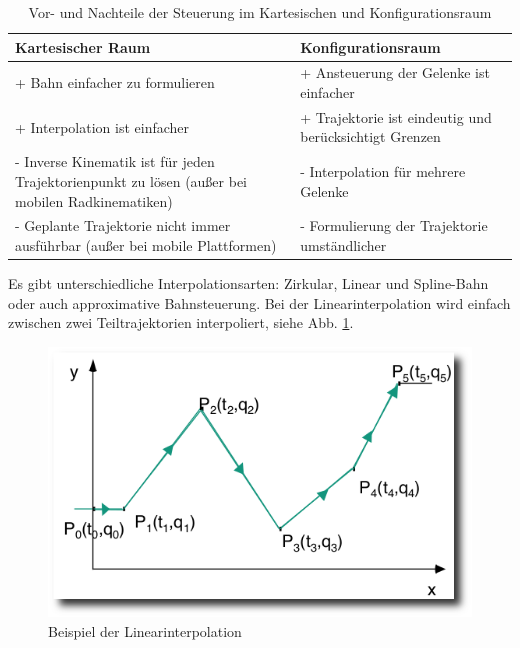 \begin{table}[h]
		\centering
		\begin{tabular}{| p{7cm} | p{7cm}|}
\hline
\textbf{Kartesischer Raum} & \textbf{Konfigurationsraum}\\
\hline
+ Bahn einfacher zu formulieren & + Ansteuerung der Gelenke ist
einfacher\\
+ Interpolation ist einfacher & + Trajektorie ist eindeutig und
berücksichtigt Grenzen\\

- Inverse Kinematik ist für jeden Trajektorienpunkt zu lösen (außer bei mobilen Radkinematiken) & - Interpolation für mehrere
Gelenke\\
- Geplante Trajektorie nicht immer ausführbar (außer bei mobile Plattformen) & - Formulierung der Trajektorie umständlicher\\
\hline
		\end{tabular}
		\caption{\label{fig:steurungProContra} Vor- und Nachteile der Steuerung im Kartesischen und Konfigurationsraum \citep{rob1}}
		\end{table}	

Es gibt unterschiedliche Interpolationsarten:
Zirkular, Linear und Spline-Bahn oder auch approximative Bahnsteuerung.
Bei der Linearinterpolation wird einfach zwischen zwei Teiltrajektorien interpoliert, siehe Abb. \ref{fig:linearinterpolation}.
\begin{figure}[h]
	\center
	\includegraphics[scale=0.35]{graphics/linearinterpolation.png}
	\caption{\label{fig:linearinterpolation} Beispiel der Linearinterpolation \cite{rob1}}
\end{figure}

